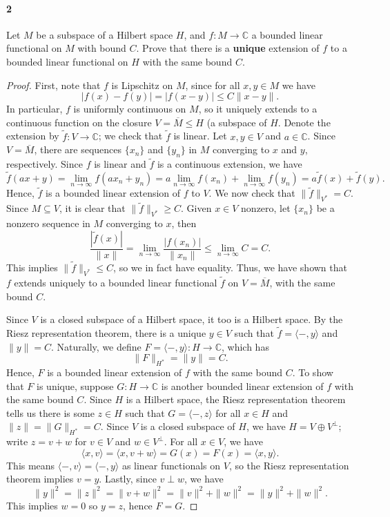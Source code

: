 \documentclass[12pt]{article}
\newlength{\myparskip}
\newenvironment{fullbox}{\begin{lrbox}{\savefullbox}\begin{minipage}{\dimexpr\textwidth-2\fboxsep\relax}\setlength{\parskip}{\myparskip}}{\end{minipage}\end{lrbox}\framebox[\textwidth]{\usebox{\savefullbox}}}
\newenvironment{pbox}[1][]{\begin{fullbox}\def\temp{#1}\ifx\temp\empty\else\paragraph{#1}\phantom{}\fi}{\end{fullbox}}
\theoremstyle{definition}
\newcommand{\C}{\mathbb{C}}
\newcommand{\<}{\langle}
\renewcommand{\>}{\rangle}
\newcommand{\clo}{\overline}
\newcommand{\seq}{\subseteq}
\begin{document}
\newpage
\begin{pbox}[2]
    Let $M$ be a subspace of a Hilbert space $H$, and $f : M \to \C$ a bounded linear functional on $M$ with bound $C$.
    Prove that there is a \textbf{unique} extension of $f$ to a bounded linear functional on $H$ with the same bound $C$.
\end{pbox}

\begin{proof}
    First, note that $f$ is Lipschitz on $M$, since for all $x, y \in M$ we have
    \[
        |f(x) - f(y)| = |f(x - y)| \leq C\|x - y\|.
    \]
    In particular, $f$ is uniformly continuous on $M$, so it uniquely extends to a continuous function on the closure $V = \clo{M} \leq H$ (a subspace of $H$.
    Denote the extension by $\tilde{f} : V \to \C$; we check that $\tilde{f}$ is linear.
    Let $x, y \in V$ and $a \in \C$.
    Since $V = \clo{M}$, there are sequences $\{x_n\}$ and $\{y_n\}$ in $M$ converging to $x$ and $y$, respectively.
    Since $f$ is linear and $\tilde{f}$ is a continuous extension, we have
    \[
        \tilde{f}(ax + y)
            = \lim_{n \to \infty} f(ax_n + y_n)
            = a\lim_{n \to \infty} f(x_n) + \lim_{n\to \infty} f(y_n)
            = a\tilde{f}(x) + \tilde{f}(y).
    \]
    Hence, $\tilde{f}$ is a bounded linear extension of $f$ to $V$.
    We now check that $\|\tilde{f}\|_{V^*} = C$.
    Since $M \seq V$, it is clear that $\|\tilde{f}\|_{V^*} \geq C$.
    Given $x \in V$ nonzero, let $\{x_n\}$ be a nonzero sequence in $M$ converging to $x$, then
    \[
        \frac{|\tilde{f}(x)|}{\|x\|}
            = \lim_{n \to \infty} \frac{|f(x_n)|}{\|x_n\|}
            \leq \lim_{n \to \infty} C
            = C.
    \]
    This implies $\|\tilde{f}\|_{V^*} \leq C$, so we in fact have equality.
    Thus, we have shown that $f$ extends uniquely to a bounded linear functional $\tilde{f}$ on $V = \clo{M}$, with the same bound $C$.

    Since $V$ is a closed subspace of a Hilbert space, it too is a Hilbert space.
    By the Riesz representation theorem, there is a unique $y \in V$ such that $\tilde{f} = \<-, y\>$ and $\|y\| = C$.
    Naturally, we define $F = \<-, y\> : H \to \C$, which has
    \[
        \|F\|_{H^*} = \|y\| = C.
    \]
    Hence, $F$ is a bounded linear extension of $f$ with the same bound $C$.
    To show that $F$ is unique, suppose $G : H \to \C$ is another bounded linear extension of $f$ with the same bound $C$.
    Since $H$ is a Hilbert space, the Riesz representation theorem tells us there is some $z \in H$ such that $G = \<-, z\>$ for all $x \in H$ and $\|z\| = \|G\|_{H^*} = C$.
    Since $V$ is a closed subspace of $H$, we have $H = V \oplus V^\perp$; write $z = v + w$ for $v \in V$ and $w \in V^\perp$.
    For all $x \in V$, we have
    \[
        \<x, v\>
            = \<x, v + w\>
            = G(x)
            = F(x)
            = \<x, y\>.
    \]
    This means $\<-, v\> = \<-, y\>$ as linear functionals on $V$, so the Riesz representation theorem implies $v = y$.
    Lastly, since $v \perp w$, we have
    \[
        \|y\|^2
            = \|z\|^2
            = \|v + w\|^2
            = \|v\|^2 + \|w\|^2
            = \|y\|^2 + \|w\|^2.
    \]
    This implies $w = 0$ so $y = z$, hence $F = G$.
\end{proof}
\end{document}
